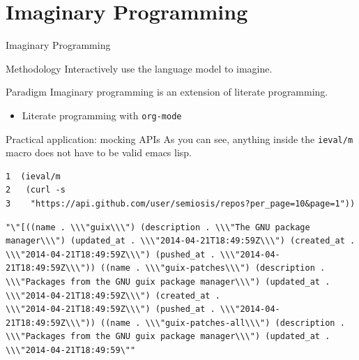 \documentclass[presentation]{beamer}
\begin{document}
\section{Imaginary Programming}
\label{sec:orgc62f538}
\begin{frame}[label={sec:orgfaa7981},fragile]{Imaginary Programming}
 \begin{block}{Methodology}
Interactively use the language model to imagine.
\end{block}

\begin{block}{Paradigm}
Imaginary programming is an extension of literate programming.

\begin{itemize}
\item Literate programming with \texttt{org-mode}
\end{itemize}
\end{block}

\begin{block}{Practical application: mocking APIs}
As you can see, anything inside the \texttt{ieval/m}
macro does not have to be valid emacs lisp.

{\tiny
\begin{verbatim}
1  (ieval/m
2   (curl -s
3    "https://api.github.com/user/semiosis/repos?per_page=10&page=1"))
\end{verbatim}

\begin{verbatim}
"\"[((name . \\\"guix\\\") (description . \\\"The GNU package manager\\\") (updated_at . \\\"2014-04-21T18:49:59Z\\\") (created_at .
\\\"2014-04-21T18:49:59Z\\\") (pushed_at . \\\"2014-04-21T18:49:59Z\\\")) ((name . \\\"guix-patches\\\") (description .
\\\"Packages from the GNU guix package manager\\\") (updated_at . \\\"2014-04-21T18:49:59Z\\\") (created_at .
\\\"2014-04-21T18:49:59Z\\\") (pushed_at . \\\"2014-04-21T18:49:59Z\\\")) ((name . \\\"guix-patches-all\\\") (description .
\\\"Packages from the GNU guix package manager\\\") (updated_at . \\\"2014-04-21T18:49:59\""
\end{verbatim}
}
\end{block}
\end{frame}
\end{document}
